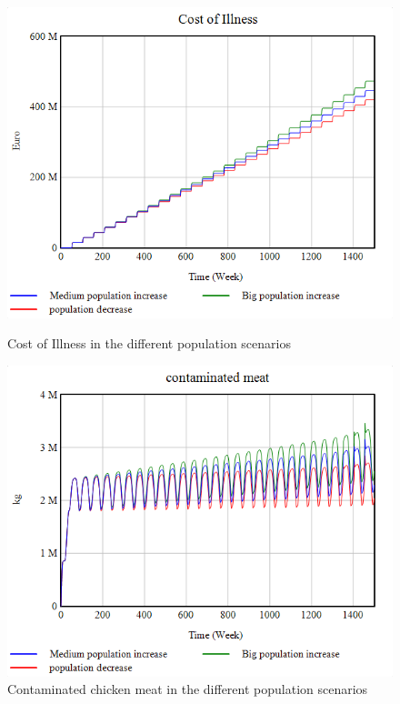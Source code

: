 \begin{figure}[h!]
    \centering
    \begin{minipage}{0.45\textwidth}
        \centering
        \includegraphics[width=1\textwidth]{images/sensitivity/Population COI.png} %
        \caption{Cost of Illness in the different population scenarios}
        \label{fig:pop_coi}
    \end{minipage}\hfill
    \begin{minipage}{0.45\textwidth}
        \centering
        \includegraphics[width=1\textwidth]{images/sensitivity/Population contaminated meat.png} %
        \caption{Contaminated chicken meat in the different population scenarios}
        \label{fig:pop_meat}
    \end{minipage}
\end{figure}

